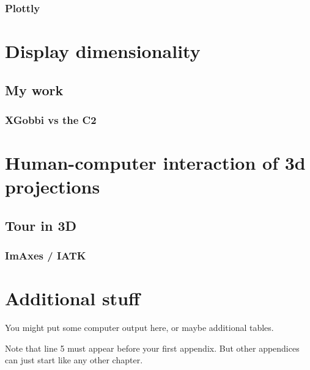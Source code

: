 \documentclass{monashthesis}
\begin{document}
\subsection{Plottly}\label{plottly}

\chapter{Display dimensionality}\label{ch:disp_dim}

\section{My work}\label{my-work}

\subsection{XGobbi vs the C2}\label{xgobbi-vs-the-c2}

\chapter{Human-computer interaction of 3d
projections}\label{ch:hci_3dproj}

\section{Tour in 3D}\label{tour-in-3d}

\subsection{ImAxes / IATK}\label{imaxes-iatk}

\appendix

\chapter{Additional stuff}\label{additional-stuff}

You might put some computer output here, or maybe additional tables.

Note that line 5 must appear before your first appendix. But other
appendices can just start like any other chapter.

\printbibliography[heading=bibintoc]
\end{document}
